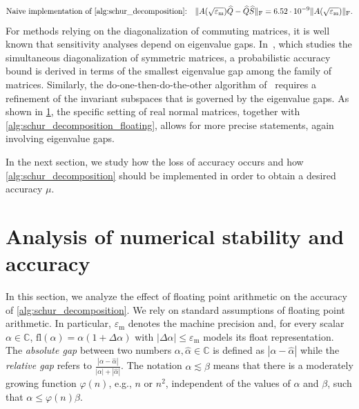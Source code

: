 \documentclass[10pt,twoside,dvipsnames]{siamart1116}
\numberwithin{algorithm}{section}
\numberwithin{equation}{section}
\newcommand{\fl}{\mathrm{fl}}
\newcommand{\new}[1]{#1}
\begin{document}
\begin{equation*}
	\text{Naive implementation of \cref{alg:schur_decomposition}:}\quad \|A(\sqrt{\varepsilon_\mathrm{m}}) \widehat{Q} - \widehat{Q} \widehat{S}\|_\mathrm{F} = 6.52\cdot 10^{-9} \|A(\sqrt{\varepsilon_\mathrm{m}})\|_\mathrm{F}.
\end{equation*}
\new{For methods relying on the diagonalization of commuting matrices, it is well known that sensitivity analyses depend on eigenvalue gaps. In~\cite{HeKressner2024}, which studies the simultaneous diagonalization of symmetric matrices, a probabilistic accuracy bound is derived in terms of the smallest eigenvalue gap among the family of matrices. Similarly, the do-one-then-do-the-other algorithm of~\cite[Alg.~2]{Sutton23} requires a refinement of the invariant subspaces that is governed by the eigenvalue gaps. As shown in \cref{sec:accuracy}, the specific setting of real normal matrices, together with \cref{alg:schur_decomposition_floating}, allows for more precise statements, again involving eigenvalue gaps.} 

In the next section, we study how the loss of accuracy occurs and how  \cref{alg:schur_decomposition} should be implemented in order to obtain a desired accuracy $\mu$.
	
\section{Analysis of numerical stability and accuracy}\label{sec:accuracy} In this section, we analyze the effect of floating point arithmetic on the accuracy of \cref{alg:schur_decomposition}. We rely on standard assumptions of floating point arithmetic. In particular, $\varepsilon_\mathrm{m}$ denotes the machine precision and, for every scalar $\alpha\in\mathbb{C}$, $\fl(\alpha)=\alpha(1+\Delta \alpha)$ with $|\Delta\alpha|\leq\varepsilon_\mathrm{m}$ models its float representation. The \emph{absolute gap} between two numbers $\alpha,\widehat{\alpha}\in\mathbb{C}$ is defined as $|\alpha - \widehat{\alpha}|$ while the \emph{relative gap} refers to $\frac{|\alpha - \widehat{\alpha}|}{|\alpha| + |\widehat{\alpha}|}$. The notation $\alpha\lesssim \beta$ means that there is a moderately growing function $\varphi(n)$, e.g., $n$ or $n^2$, independent of the values of $\alpha$ and $\beta$, such that $\alpha\leq \varphi(n)\beta$. 
\end{document}
